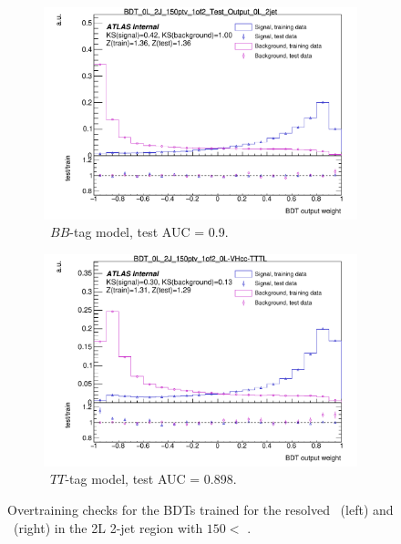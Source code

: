 

\begin{figure}[h!]
    \hspace{-0.3cm}
    \begin{subfigure}[b]{0.49\textwidth}
        \centering
      \includegraphics[width=\textwidth]{Images/VH/Discriminants/OvertrainCheck_BDT_0L_2J_150ptv_1of2_Test_Output_0L_2jet.pdf}
    \caption{\vhb\ $BB$-tag model, test AUC = 0.9.} 
    \end{subfigure}
    \begin{subfigure}[b]{0.49\textwidth}
        \centering
      \includegraphics[width=\textwidth]{Images/VH/Discriminants/OvertrainCheck_BDT_0L_2J_150ptv_1of2_0L-VHcc-TTTL.pdf}
      \caption{\vhc\ $TT$-tag model, test AUC = 0.898.}
    \end{subfigure}
    \caption{Overtraining checks for the BDTs trained for the resolved \vhb\ (left) and \vhc\ (right) in the 2L 2-jet region with $150 <$ \ptv.}
    \label{fig:overtrainingCheck}
\end{figure} 


